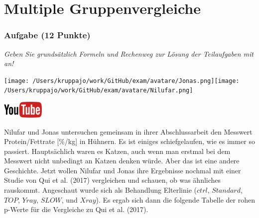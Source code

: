 \documentclass[a4paper, 9pt]{scrartcl}\usepackage[]{graphicx}\usepackage[]{xcolor}
\begin{document}
 
\clearpage
\part{Multiple Gruppenvergleiche}

\section{Aufgabe \hfill (12 Punkte)}

\textit{Geben Sie grundsätzlich Formeln und Rechenweg zur Lösung der Teilaufgaben mit an!} \\[1Ex]
 

 
\begin{minipage}[t]{0.5\textwidth}
\texttt{[image: /Users/kruppajo/work/GitHub/exam/avatare/Jonas.png]}\hspace{-4mm}\texttt{[image: /Users/kruppajo/work/GitHub/exam/avatare/Nilufar.png]}
\end{minipage}
\begin{minipage}[t]{0.5\textwidth}
\hfill
\href{https://youtu.be/kHmfEmU6lrk}{\includegraphics[width = 2cm]{img/youtube}}
\end{minipage}
\vspace{1ex}



Nilufar und Jonas untersuchen gemeinsam in ihrer Abschlussarbeit den Messwert Protein/Fettrate [\%/kg] in Hühnern. Es ist einiges schiefgelaufen, wie es immer so passiert. Hauptsächlich waren es Katzen, auch wenn man erstmal bei dem Messwert nicht unbedingt an Katzen denken würde. Aber das ist eine andere Geschichte. Jetzt wollen Nilufar und Jonas ihre Ergebnisse nochmal mit einer Studie von Qui et al. (2017) vergleichen und schauen, ob was ähnliches rauskommt. Angeschaut wurde sich als Behandlung Elterlinie ($ctrl$, $Standard$, $TOP$, $Yray$, $SLOW$, und $Xray$). Es ergab sich dann die folgende Tabelle der rohen p-Werte für die Vergleiche zu Qui et al. (2017).
\end{document}
